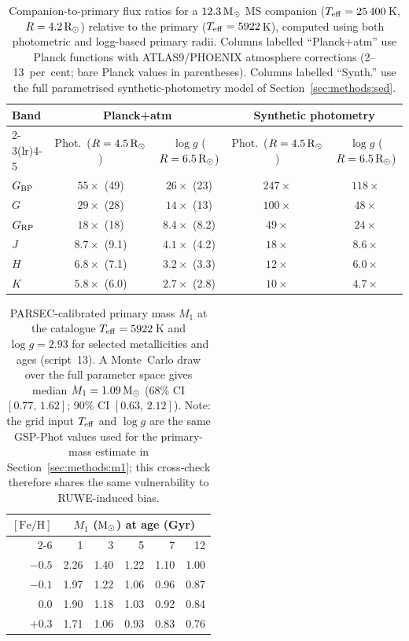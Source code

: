 \documentclass[usenatbib,fleqn]{mnras}
\newcommand{\Msun}{{\rm M}_\odot}
\newcommand{\Rsun}{{\rm R}_\odot}
\begin{document}
\begin{table}
\centering
\caption{Companion-to-primary flux ratios for a
$12.3\,\Msun$ MS companion ($T_{\rm eff} = 25\,400$\,K,
$R = 4.2\,\Rsun$) relative to the primary
($T_{\rm eff} = 5922$\,K), computed using both
photometric and logg-based primary radii.  Columns labelled
``Planck+atm'' use Planck functions with ATLAS9/PHOENIX
atmosphere corrections (2--13~per~cent; bare Planck values
in parentheses).  Columns labelled ``Synth.'' use the full
parametrised synthetic-photometry model of
Section~\ref{sec:methods:sed}.}
\label{tab:fluxratios}
\begin{tabular}{lcccc}
\toprule
Band & \multicolumn{2}{c}{Planck+atm} &
       \multicolumn{2}{c}{Synthetic photometry} \\
\cmidrule(lr){2-3}\cmidrule(lr){4-5}
     & Phot.\ ($R = 4.5\,\Rsun$) & $\log g$ ($R = 6.5\,\Rsun$)
     & Phot.\ ($R = 4.5\,\Rsun$) & $\log g$ ($R = 6.5\,\Rsun$) \\
\midrule
$G_{\rm BP}$     & $55\times$ (49)   & $26\times$ (23)   & $247\times$ & $118\times$ \\
$G$              & $29\times$ (28)   & $14\times$ (13)   & $100\times$ & $48\times$  \\
$G_{\rm RP}$     & $18\times$ (18)   & $8.4\times$ (8.2) & $49\times$  & $24\times$  \\
$J$              & $8.7\times$ (9.1)  & $4.1\times$ (4.2) & $18\times$  & $8.6\times$ \\
$H$              & $6.8\times$ (7.1)  & $3.2\times$ (3.3) & $12\times$  & $6.0\times$ \\
$K$              & $5.8\times$ (6.0)  & $2.7\times$ (2.8) & $10\times$  & $4.7\times$ \\
\bottomrule
\end{tabular}
\end{table}

\begin{table}
\centering
\caption{PARSEC-calibrated primary mass $M_1$ at the catalogue
$T_{\rm eff} = 5922\,$K and $\log g = 2.93$ for selected
metallicities and ages (script~13).  A Monte~Carlo draw over
the full parameter space gives median
$M_1 = 1.09\,\Msun$ (68\% CI $[0.77,\,1.62]$; 90\%
CI $[0.63,\,2.12]$).  Note: the grid input
$T_{\rm eff}$ and $\log g$ are the same GSP-Phot values
used for the primary-mass estimate in
Section~\ref{sec:methods:m1}; this cross-check therefore
shares the same vulnerability to RUWE-induced bias.}
\label{tab:parsec_grid}
\begin{tabular}{rrrrrr}
\toprule
$[\mathrm{Fe/H}]$ & \multicolumn{5}{c}{$M_1$ ($\Msun$) at age (Gyr)} \\
\cmidrule(lr){2-6}
 & 1 & 3 & 5 & 7 & 12 \\
\midrule
$-0.5$ & 2.26 & 1.40 & 1.22 & 1.10 & 1.00 \\
$-0.1$ & 1.97 & 1.22 & 1.06 & 0.96 & 0.87 \\
$ 0.0$ & 1.90 & 1.18 & 1.03 & 0.92 & 0.84 \\
$+0.3$ & 1.71 & 1.06 & 0.93 & 0.83 & 0.76 \\
\bottomrule
\end{tabular}
\end{table}
\end{document}
